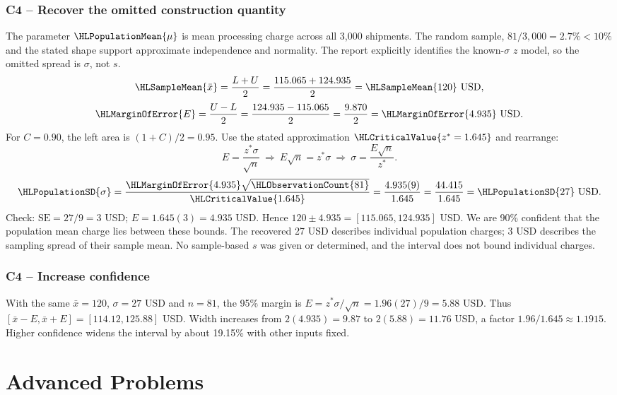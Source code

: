 \subsubsection*{C4 -- Recover the omitted construction quantity}\label{sol:c4-3-a}
The parameter $\HLPopulationMean{\mu}$ is mean processing charge across all 3,000 shipments. The random sample, $81/3{,}000=2.7\%<10\%$ and the stated shape support approximate independence and normality. The report explicitly identifies the known-$\sigma$ $z$ model, so the omitted spread is $\sigma$, not $s$.
\[
\HLSampleMean{\bar x}=\frac{L+U}{2}=\frac{115.065+124.935}{2}
=\HLSampleMean{120}\text{ USD},
\]
\[
\HLMarginOfError{E}=\frac{U-L}{2}=\frac{124.935-115.065}{2}
=\frac{9.870}{2}=\HLMarginOfError{4.935}\text{ USD}.
\]
For $C=0.90$, the left area is $(1+C)/2=0.95$. Use the stated approximation $\HLCriticalValue{z^*=1.645}$ and rearrange:
\[
E=\frac{z^*\sigma}{\sqrt n}
\ \Longrightarrow\ E\sqrt n=z^*\sigma
\ \Longrightarrow\ \sigma=\frac{E\sqrt n}{z^*}.
\]
\[
\HLPopulationSD{\sigma}=\frac{\HLMarginOfError{4.935}\sqrt{\HLObservationCount{81}}}{\HLCriticalValue{1.645}}
=\frac{4.935(9)}{1.645}=\frac{44.415}{1.645}=\HLPopulationSD{27}\text{ USD}.
\]
Check: $\mathrm{SE}=27/9=3$ USD; $E=1.645(3)=4.935$ USD. Hence $120\pm4.935=[115.065,124.935]$ USD. We are 90\% confident that the population mean charge lies between these bounds. The recovered 27 USD describes individual population charges; 3 USD describes the sampling spread of their sample mean. No sample-based $s$ was given or determined, and the interval does not bound individual charges.

\subsubsection*{C4 -- Increase confidence}\label{sol:c4-3-b}
With the same $\bar x=120$, $\sigma=27$ USD and $n=81$, the 95\% margin is $E=z^*\sigma/\sqrt n=1.96(27)/9=5.88$ USD. Thus $[\bar x-E,\bar x+E]=[114.12,125.88]$ USD. Width increases from $2(4.935)=9.87$ to $2(5.88)=11.76$ USD, a factor $1.96/1.645\approx1.1915$. Higher confidence widens the interval by about 19.15\% with other inputs fixed.

\section{Advanced Problems}\label{sec:advanced}
